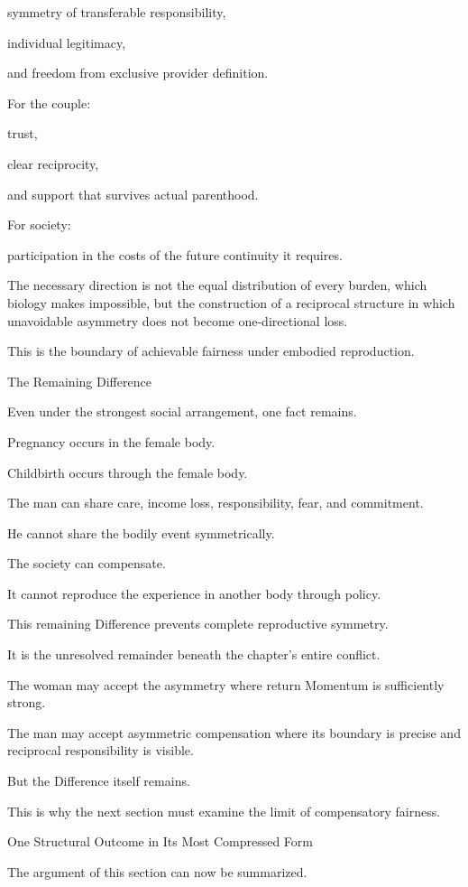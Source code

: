 symmetry of transferable responsibility,

individual legitimacy,

and freedom from exclusive provider definition.

For the couple:

trust,

clear reciprocity,

and support that survives actual parenthood.

For society:

participation in the costs of the future continuity it requires.

The necessary direction is not the equal distribution of every burden, which biology makes impossible, but the construction of a reciprocal structure in which unavoidable asymmetry does not become one-directional loss.

This is the boundary of achievable fairness under embodied reproduction.

The Remaining Difference

Even under the strongest social arrangement, one fact remains.

Pregnancy occurs in the female body.

Childbirth occurs through the female body.

The man can share care, income loss, responsibility, fear, and commitment.

He cannot share the bodily event symmetrically.

The society can compensate.

It cannot reproduce the experience in another body through policy.

This remaining Difference prevents complete reproductive symmetry.

It is the unresolved remainder beneath the chapter’s entire conflict.

The woman may accept the asymmetry where return Momentum is sufficiently strong.

The man may accept asymmetric compensation where its boundary is precise and reciprocal responsibility is visible.

But the Difference itself remains.

This is why the next section must examine the limit of compensatory fairness.

One Structural Outcome in Its Most Compressed Form

The argument of this section can now be summarized.

